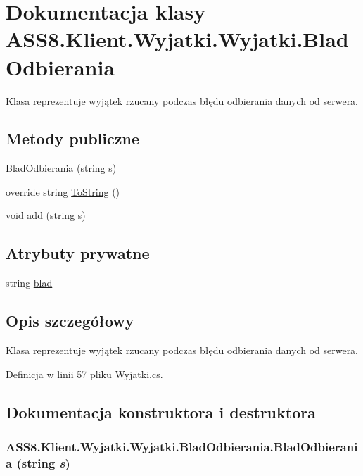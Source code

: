 \hypertarget{a00032}{
\section{Dokumentacja klasy ASS8.Klient.Wyjatki.Wyjatki.BladOdbierania}
\label{dc/d87/a00032}
}
Klasa reprezentuje wyjątek rzucany podczas błędu odbierania danych od serwera.  


\subsection*{Metody publiczne}
\begin{CompactItemize}
\item 
\hyperlink{a00032_d8bac78a642ee1b0399b9e309f1f87ec}{BladOdbierania} (string s)
\item 
override string \hyperlink{a00032_889290a65d2d550ce1a6ea3b58d77245}{ToString} ()
\item 
void \hyperlink{a00032_03d1694a467256c129054ac47a6971a9}{add} (string s)
\end{CompactItemize}
\subsection*{Atrybuty prywatne}
\begin{CompactItemize}
\item 
string \hyperlink{a00032_cbb5d38fe623410f76972845d467e8d9}{blad}
\end{CompactItemize}


\subsection{Opis szczegółowy}
Klasa reprezentuje wyjątek rzucany podczas błędu odbierania danych od serwera. 



Definicja w linii 57 pliku Wyjatki.cs.

\subsection{Dokumentacja konstruktora i destruktora}
\hypertarget{a00032_d8bac78a642ee1b0399b9e309f1f87ec}{
\subsubsection[{BladOdbierania}]{\setlength{\rightskip}{0pt plus 5cm}ASS8.Klient.Wyjatki.Wyjatki.BladOdbierania.BladOdbierania (string {\em s})}}
\label{dc/d87/a00032_d8bac78a642ee1b0399b9e309f1f87ec}




